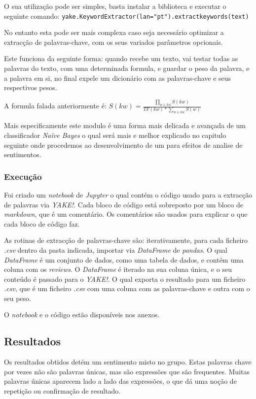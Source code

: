 O sua utilização pode ser simples, basta instalar a biblioteca e executar o seguinte comando: \texttt{yake.KeywordExtractor(lan="pt").extract\textunderscore keywords(text)}

No entanto esta pode ser mais complexa caso seja necessário optimizar a extracção de palavras-chave, com os seus variados parâmetros opcionais.

Este funciona da seguinte forma: quando recebe um texto, vai testar todas as palavras do texto, com uma determinada formula, e guardar o peso da palavra, e a palavra em si, no final expele um dicionário com as palavras-chave e seus respectivos pesos.

A formula falada anteriormente é:
\begin{math}
    S(kw) = \frac{\prod_{w \in kw}^{} S(kw)}{TF(kw) * \sum_{w \in kw}^{}S(w)}
\end{math}

Mais especificamente este modulo é uma forma mais delicada e avançada de um classificador \textit{Naïve Bayes} o qual será mais e melhor explicado no capitulo seguinte onde procedemos ao desenvolvimento de um para efeitos de analise de sentimentos.

\subsubsection{Execução}

Foi criado um \textit{notebook} de \textit{Jupyter} o qual contém o código usado para a extracção de palavras via \textit{YAKE!}. Cada bloco de código está sobreposto por um bloco de \textit{markdown}, que é um comentário. Os comentários são usados para explicar o que cada bloco de código faz.

As rotinas de extracção de palavras-chave são: iterativamente, para cada ficheiro \textit{.csv} dentro da pasta indicada, importar via \textit{DataFrame} de \textit{pandas}. O qual \textit{DataFrame} é um conjunto de dados, como uma tabela de dados, e contém uma coluna com os \textit{reviews}. O \textit{DataFrame} é iterado na sua coluna única, e o seu conteúdo é passado para o \textit{YAKE!}. O qual exporta o resultado para um ficheiro \textit{.csv}, que é um ficheiro \textit{.csv} com uma coluna com as palavras-chave e outra com o seu peso.

O \textit{notebook} e o código estão disponíveis nos anexos.

\subsection{Resultados}

Os resultados obtidos detém um sentimento misto no grupo. Estas palavras chave por vezes não são palavras únicas, mas são expressões que são frequentes. Muitas palavras únicas aparecem lado a lado das expressões, o que dá uma noção de repetição ou confirmação de resultado.
